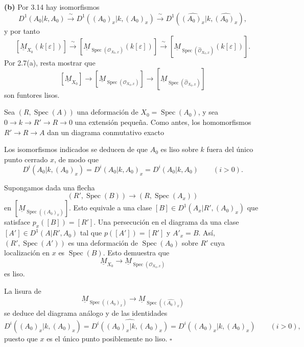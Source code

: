\smallskip
\noindent\textbf{(b)}
Por 3.14 hay isomorfismos
\[
D^1(A_0|k,A_0)
\xrightarrow{\ \sim\ }
D^1((A_0)_x|k,(A_0)_x)
\xrightarrow{\ \sim\ }
D^1(\widehat{(A_0)_x}|k,\widehat{(A_0)_x}),
\]
y por tanto
\[
[\underline M_{X_0}(k[\varepsilon])]
\xrightarrow{\ \sim\ }
[\underline M_{\operatorname{Spec}(\mathcal O_{X_0,x})}
 (k[\varepsilon])]
\xrightarrow{\ \sim\ }
[\underline M_{\operatorname{Spec}(\widehat{\mathcal O}_{X_0,x})}
 (k[\varepsilon])].
\]
Por 2.7(a), resta mostrar que
\[
[\underline M_{X_0}]
\longrightarrow
[\underline M_{\operatorname{Spec}(\mathcal O_{X_0,x})}]
\longrightarrow
[\underline M_{\operatorname{Spec}(\widehat{\mathcal O}_{X_0,x})}]
\]
son funtores lisos.

Sea $(R,\operatorname{Spec}(A))$ una deformación de
$X_0=\operatorname{Spec}(A_0)$, y sea
$0\longrightarrow k\longrightarrow R'\longrightarrow R
\longrightarrow0$ una extensión pequeña. Como antes, los
homomorfismos $R'\longrightarrow R\longrightarrow A$ dan un diagrama
conmutativo exacto


\begin{center}
\scriptsize
{}
\end{center}
Los isomorfismos indicados se deducen de que $A_0$ es liso sobre $k$
fuera del único punto cerrado $x$, de modo que
\[
D^i(A_0|k,(A_0)_x)
=D^i(A_0|k,A_0)_x
=D^i(A_0|k,A_0)
\qquad(i>0).
\]

Supongamos dada una flecha
\[
(R',\operatorname{Spec}(B))
\longrightarrow(R,\operatorname{Spec}(A_x))
\]
en $[\underline M_{\operatorname{Spec}((A_0)_x)}]$. Esto equivale a
una clase $[B]\in D^1(A_x|R',(A_0)_x)$ que satisface
$p_x([B])=[R']$. Una persecución en el diagrama da una clase
$[A']\in D^1(A|R',A_0)$ tal que $p([A'])=[R']$ y $A'_x=B$.
Así, $(R',\operatorname{Spec}(A'))$ es una deformación de
$\operatorname{Spec}(A_0)$ sobre $R'$ cuya localización en $x$ es
$\operatorname{Spec}(B)$. Esto demuestra que
\[
\underline M_{X_0}\longrightarrow
\underline M_{\operatorname{Spec}(\mathcal O_{X_0,x})}
\]
es liso.

La lisura de
\[
\underline M_{\operatorname{Spec}((A_0)_x)}
\longrightarrow
\underline M_{\operatorname{Spec}(\widehat{(A_0)_x})}
\]
se deduce del diagrama análogo y de las identidades
\[
D^i((A_0)_x|k,\widehat{(A_0)_x})
=\widehat{D^i((A_0)_x|k,(A_0)_x)}
=D^i((A_0)_x|k,(A_0)_x)
\qquad(i>0),
\]
puesto que $x$ es el único punto posiblemente no liso.
\hfill$\square$

